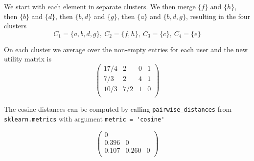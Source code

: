 \documentclass{article}
\begin{document}
We start with each element in separate clusters.
We then merge \(\{f\}\) and \(\{h\}\),
then \(\{b\}\) and \(\{d\}\),
then \(\{b, d\}\) and \(\{g\}\),
then \(\{a\}\) and \(\{b,d,g\}\),
resulting in the four clusters
\begin{equation*}
    C_1 = \{a,b,d,g\},\ C_2 = \{f,h\},\ C_3 = \{c\},\ C_4 = \{e\}
\end{equation*}

On each cluster we average over the non-empty entries for each user
and the new utility matrix is
\begin{equation*}
    \begin{pmatrix}
        17/4 & 2 & 0 & 1\\
        7/3 & 2 & 4 & 1\\
        10/3 & 7/2 & 1 & 0\\
    \end{pmatrix}
\end{equation*}

The cosine distances can be computed by calling
\verb|pairwise_distances| from 
\verb|sklearn.metrics|
with argument \verb|metric = 'cosine'|

\begin{equation*}
    \begin{pmatrix}
        0\\
        0.396 & 0\\
        0.107 & 0.260 & 0\\
    \end{pmatrix}
\end{equation*}




\end{document}
